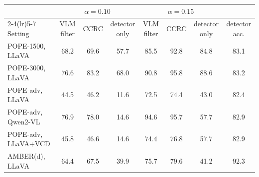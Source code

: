 \begin{tabular}{lccccccc}
\toprule
 & \multicolumn{3}{c}{$\alpha=0.10$} & \multicolumn{3}{c}{$\alpha=0.15$} & \\
\cmidrule(lr){2-4}\cmidrule(lr){5-7}
Setting & VLM filter & CCRC & detector only & VLM filter & CCRC & detector only & detector acc.\\
\midrule
POPE-1500, LLaVA & 68.2 & 69.6 & 57.7 & 85.5 & 92.8 & 84.8 & 83.1\\
POPE-3000, LLaVA & 76.6 & 83.2 & 68.0 & 90.8 & 95.8 & 88.6 & 83.2\\
POPE-adv, LLaVA & 44.5 & 46.2 & 11.6 & 72.5 & 74.4 & 43.0 & 82.4\\
POPE-adv, Qwen2-VL & 76.9 & 78.0 & 14.6 & 94.6 & 95.7 & 57.7 & 82.9\\
POPE-adv, LLaVA+VCD & 45.8 & 46.6 & 14.6 & 74.4 & 76.8 & 57.7 & 82.9\\
AMBER(d), LLaVA & 64.4 & 67.5 & 39.9 & 75.7 & 79.6 & 41.2 & 92.3\\
\bottomrule
\end{tabular}
